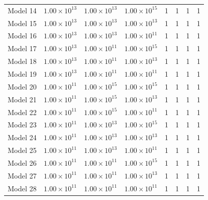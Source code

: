 \documentclass[journal=aesccq,manuscript=draft]{achemso}
\begin{document}
\begin{table}
\begin{tabular}{cccccccc}
Model 14 & \(1.00 \times 10^{13}\) & \(1.00 \times 10^{13}\) & \(1.00 \times 10^{15}\) & 1 & 1 & 1 & 1 \\
Model 15 & \(1.00 \times 10^{13}\) & \(1.00 \times 10^{13}\) & \(1.00 \times 10^{13}\) & 1 & 1 & 1 & 1 \\
Model 16 & \(1.00 \times 10^{13}\) & \(1.00 \times 10^{13}\) & \(1.00 \times 10^{11}\) & 1 & 1 & 1 & 1 \\
Model 17 & \(1.00 \times 10^{13}\) & \(1.00 \times 10^{11}\) & \(1.00 \times 10^{15}\) & 1 & 1 & 1 & 1 \\
Model 18 & \(1.00 \times 10^{13}\) & \(1.00 \times 10^{11}\) & \(1.00 \times 10^{13}\) & 1 & 1 & 1 & 1 \\
Model 19 & \(1.00 \times 10^{13}\) & \(1.00 \times 10^{11}\) & \(1.00 \times 10^{11}\) & 1 & 1 & 1 & 1 \\
Model 20 & \(1.00 \times 10^{11}\) & \(1.00 \times 10^{15}\) & \(1.00 \times 10^{15}\) & 1 & 1 & 1 & 1 \\
Model 21 & \(1.00 \times 10^{11}\) & \(1.00 \times 10^{15}\) & \(1.00 \times 10^{13}\) & 1 & 1 & 1 & 1 \\
Model 22 & \(1.00 \times 10^{11}\) & \(1.00 \times 10^{15}\) & \(1.00 \times 10^{11}\) & 1 & 1 & 1 & 1 \\
Model 23 & \(1.00 \times 10^{11}\) & \(1.00 \times 10^{13}\) & \(1.00 \times 10^{15}\) & 1 & 1 & 1 & 1 \\
Model 24 & \(1.00 \times 10^{11}\) & \(1.00 \times 10^{13}\) & \(1.00 \times 10^{13}\) & 1 & 1 & 1 & 1 \\
Model 25 & \(1.00 \times 10^{11}\) & \(1.00 \times 10^{13}\) & \(1.00 \times 10^{11}\) & 1 & 1 & 1 & 1 \\
Model 26 & \(1.00 \times 10^{11}\) & \(1.00 \times 10^{11}\) & \(1.00 \times 10^{15}\) & 1 & 1 & 1 & 1 \\
Model 27 & \(1.00 \times 10^{11}\) & \(1.00 \times 10^{11}\) & \(1.00 \times 10^{13}\) & 1 & 1 & 1 & 1 \\
Model 28 & \(1.00 \times 10^{11}\) & \(1.00 \times 10^{11}\) & \(1.00 \times 10^{11}\) & 1 & 1 & 1 & 1 \\
    \hline
  \end{tabular}
\end{table}
\end{document}
